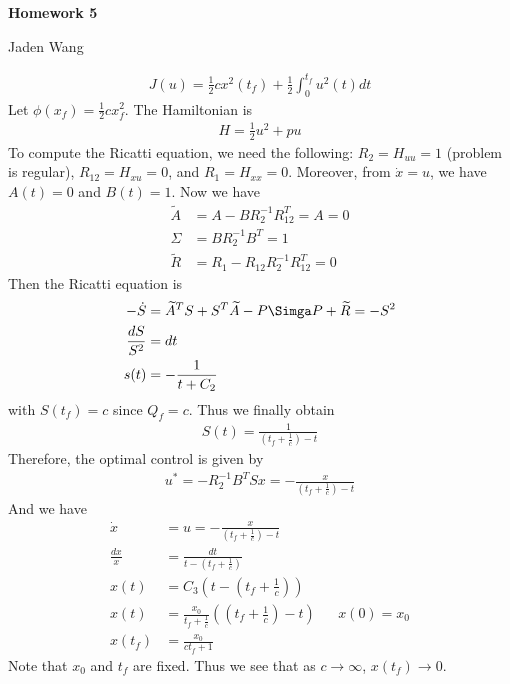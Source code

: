 \documentclass[12pt]{article}
\begin{document}
\centerline {\textsf{\textbf{\LARGE{Homework 5}}}}
\centerline {Jaden Wang}
\vspace{.15in}
\begin{problem}[1]
\begin{align*}
	J(u) = \frac{1}{2} cx^2(t_f) + \frac{1}{2} \int_0^{t_f} u^2(t) dt
\end{align*}
Let $ \phi(x_f) = \frac{1}{2}c x_f^2$. The Hamiltonian is
 \begin{align*}
	 H =\frac{1}{2} u^2 + p u
\end{align*}
To compute the Ricatti equation, we need the following: $ R_2 = H_{uu} = 1$ (problem is regular), $R_{12} = H_{xu} = 0$, and $R_1 = H_{x x} = 0$. Moreover, from $ \dot{x} = u$, we have $ A(t) = 0$ and  $ B(t) = 1$. Now we have
 \begin{align*}
	\widetilde{ A} &= A - BR_2^{-1}R_{12}^{T} = A=0 \\
	\Sigma &= BR_2^{-1}B^{T} = 1 \\
	\widetilde{ R} &= R_1 - R_{12} R_2^{-1} R_{12}^{T} =0
\end{align*}
Then the Ricatti equation is
\begin{align*}
	-\dot{S} &= \widetilde{ A}^{T} S + S^{T} \widetilde{ A} - P \Simga P + \widetilde{ R} = -S^2\\
	\frac{dS}{S^2} &= dt \\
	s(t) &= -\frac{1}{t+C_2}
\end{align*}
with $ S(t_f) = c$ since $ Q_f = c$. Thus we finally obtain
\begin{align*}
	S(t) = \frac{1}{\left( t_f + \frac{1}{c} \right) -t }
\end{align*}
Therefore, the optimal control is given by
\begin{align*}
	u^*  = -R_2^{-1} B^{T} Sx =- \frac{x}{\left( t_f +\frac{1}{c}\right) -t }
\end{align*}
And we have
\begin{align*}
	\dot{x} &=u= - \frac{x}{\left( t_{f} + \frac{1}{c} \right)-t }\\
	\frac{dx}{x} &= \frac{dt}{t-\left( t_f + \frac{1}{c} \right) } \\
	x(t) &= C_3 \left( t- \left( t_f + \frac{1}{c} \right)  \right) \\
	x(t) &= \frac{x_0}{t_f + \frac{1}{c}} \left( \left( t_f + \frac{1}{c} \right) -t \right)  && x(0) = x_0\\
	x(t_f) &= \frac{x_0}{ c t_f + 1} 
\end{align*}
Note that $ x_0$ and $ t_f$ are fixed. Thus we see that as $ c \to \infty$, $ x(t_f) \to 0$.

\end{problem}
\end{document}
